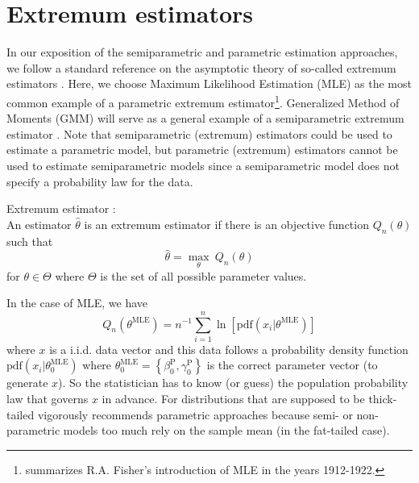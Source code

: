 \section{Extremum estimators}

In our exposition of the semiparametric and parametric estimation approaches, we follow a standard reference on the asymptotic theory of so-called extremum estimators \citep{NM94}. 
Here, we choose Maximum Likelihood Estimation (MLE) as the most common example of a parametric extremum estimator\footnote{\cite{A97} summarizes R.A. Fisher's introduction of MLE in the years 1912-1922.}.
Generalized Method of Moments (GMM) will serve as a general example of a semiparametric extremum estimator \citep{H82,H12}.
Note that semiparametric (extremum) estimators could be used to estimate a parametric model, but parametric (extremum) estimators cannot be used to estimate semiparametric models since a semiparametric model does not specify a probability law for the data.


\begin{definition}
	\label{def:extremum_estimator}
	Extremum estimator \cite[Equation 1.1]{NM94}: \\
	An estimator $\hat{\theta}$ is an extremum estimator if there is an objective function $Q_n(\theta)$ such that
	\[
	\hat{\theta} = \max_{\theta} \ Q_n(\theta)
	\]
	for $\theta \in \Theta$ where $\Theta$ is the set of all possible parameter values.
\end{definition}

In the case of MLE, we have
\[
Q_n(\theta^{\mathrm{MLE}}) = n^{-1} \sum_{i=1}^n \ln \left[ \mathrm{pdf} (x_i | \theta^{\mathrm{MLE}}) \right]
\]
where $x$ is a i.i.d. data vector and this data follows a probability density function $\mathrm{pdf} (x_i | \theta_0^{\mathrm{MLE}})$ where $\theta_0^{\mathrm{MLE}}= \left\{ \beta_0^{\mathrm{P}}, \gamma_0^{\mathrm{P}} \right\}$ is the correct parameter vector (to generate $x$).
So the statistician has to know (or guess) the population probability law that governs $x$ in advance.
For distributions that are supposed to be thick-tailed \cite{Taleb20} vigorously recommends parametric approaches because semi- or non-parametric models too much rely on the sample mean (in the fat-tailed case).

